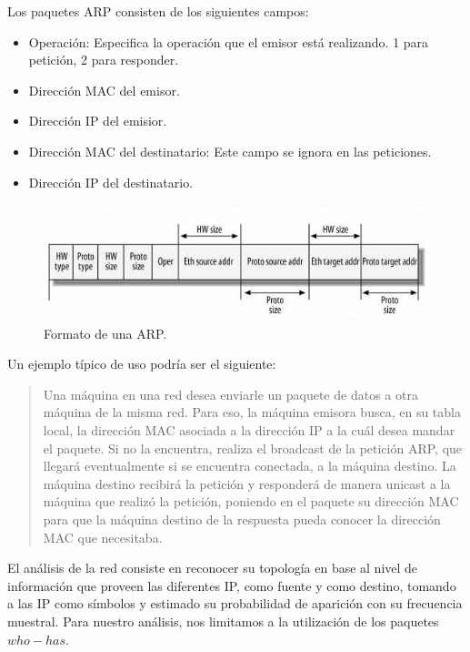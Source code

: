 \documentclass[10pt, a4paper]{article}
\begin{document}
Los paquetes ARP consisten de los siguientes campos:
\begin{itemize}
\item Operación: Especifica la operación que el emisor está realizando. 1 para petición, 2 para responder.
\item Dirección MAC del emisor.
\item Dirección IP del emisior.
\item Dirección MAC del destinatario: Este campo se ignora en las peticiones.
\item Dirección IP del destinatario.
\end{itemize}
\begin{figure}[H] %
\begin{center}
\includegraphics[width=350pt]{../imgs/arp.jpg}
\caption{Formato de una ARP.}
\end{center}
\end{figure}

Un ejemplo típico de uso podría ser el siguiente:

\begin{quotation}
Una máquina en una red desea enviarle un paquete de datos a otra máquina de la misma red. Para eso, la máquina emisora busca, en su tabla local, la dirección MAC asociada a la dirección IP a la cuál desea mandar el paquete. Si no la encuentra, realiza el broadcast de la petición ARP, que llegará eventualmente si se encuentra conectada, a la máquina destino. 
La máquina destino recibirá la petición y responderá de manera unicast a la máquina que realizó la petición, poniendo en el paquete su dirección MAC para que la máquina destino de la respuesta pueda conocer la dirección MAC que necesitaba.
\end{quotation}

El análisis de la red consiste en reconocer su topología en base al nivel de información que proveen las diferentes IP, como fuente y como destino, tomando a las IP como símbolos y estimado su probabilidad de aparición con su frecuencia muestral. Para nuestro análisis, nos limitamos a la utilización de los paquetes $who-has$.
\end{document}

